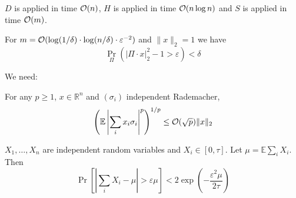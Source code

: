 \documentclass[11pt]{article}
\newcommand{\E}{{\mathbb E}}
\newcommand{\eps}{\varepsilon}
\begin{document}
$D$ is applied in time $\mathcal{O}(n)$, $H$ is applied in time $\mathcal{O}(n \log n)$ and $S$ is applied in time $\mathcal{O}(m)$.



\begin{theorem}
For $m = \bigo(\log(1/\delta) \cdot \log(n/\delta) \cdot \eps^{-2})$ and $\|x\|_2 = 1$ we have 
$$\Pr_{\Pi} ( | \Pi \cdot x |_2^2 - 1  > \eps) < \delta $$
\end{theorem}

We need:
\begin{theorem}
For any $p \ge 1$, $x \in \mathbb{R}^n$ and $(\sigma_i)$ independent Rademacher,
$$ \left( \E \left|\sum_i x_i \sigma_i\right|^p \right)^{1/p} \le \bigo(\sqrt{p}) \| x \|_2 $$
\end{theorem}
\begin{theorem}
$X_1,\ldots,X_n$ are independent random variables and $X_i \in [0,\tau]$. Let $\mu = \E \sum_i X_i $. Then
$$\Pr[ | \sum_i X_i - \mu| > \eps \mu ] < 2 \exp(- \frac{\eps^2 \mu}{2 \tau} )$$
\end{theorem}
\end{document}
